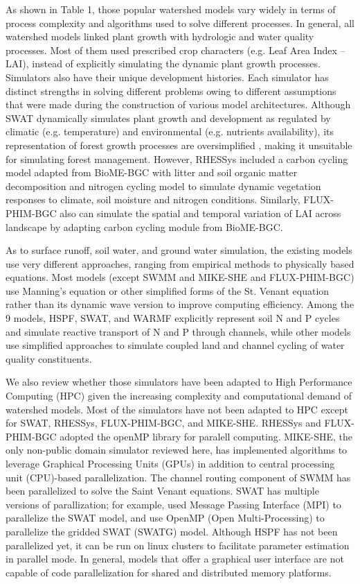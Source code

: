 \documentclass[preprint,review, 12pt]{elsarticle}
\begin{document}
As shown in Table 1, those popular watershed models vary widely in terms of process complexity and algorithms used to solve different processes. In general, all watershed models linked plant growth with hydrologic and water quality processes. Most of them used prescribed crop characters (e.g. Leaf Area Index -- LAI), instead of explicitly simulating the dynamic plant growth processes. Simulators also have their unique development histories. Each simulator has distinct strengths in solving different problems owing to different assumptions that were made during the construction of various model architectures. Although SWAT dynamically simulates plant growth and development as regulated by climatic (e.g. temperature) and environmental (e.g. nutrients availability), its representation of forest growth processes are oversimplified \citep{Yang2016}, making it unsuitable for simulating forest management. However, RHESSys \citep{Tague2004d} included a carbon cycling model adapted from BioME-BGC \citep{thornton1998regional} with litter and soil organic matter decomposition and nitrogen cycling model \citep{parton1996generalized} to simulate dynamic vegetation responses to climate, soil moisture and nitrogen conditions. Similarly, FLUX-PHIM-BGC \citep{Shi2018} also can simulate the spatial and temporal variation of LAI across landscape by adapting carbon cycling module from BioME-BGC.

As to surface runoff, soil water, and ground water simulation, the existing models use very different approaches, ranging from empirical methods to physically based equations. Most models (except SWMM and MIKE-SHE and FLUX-PHIM-BGC) use Manning’s equation or other simplified forms of the St. Venant equation rather than its dynamic wave version to improve computing efficiency. Among the 9 models, HSPF, SWAT, and WARMF explicitly represent soil N and P cycles and simulate reactive transport of N and P through channels, while other models use simplified approaches to simulate coupled land and channel cycling of water quality constituents. 

We also review whether those simulators have been adapted to High Performance Computing (HPC) given the increasing complexity and computational demand of watershed models. Most of the simulators have not been adapted to HPC except for SWAT, RHESSys, FLUX-PHIM-BGC, and MIKE-SHE. RHESSys and FLUX-PHIM-BGC adopted the openMP library for paralell computing. MIKE-SHE, the only non-public domain simulator reviewed here, has implemented algorithms to leverage Graphical Processing Units (GPUs) in addition to central processing unit (CPU)-based parallelization. The channel routing component of SWMM has been parallelized to solve the Saint Venant equations. SWAT has multiple versions of parallization; for example, \cite{Wu2013} used Message Passing Interface (MPI) to parallelize the SWAT model, and  \cite{Zhang2017} use OpenMP (Open Multi-Processing) to parallelize the gridded SWAT (SWATG) model. Although HSPF has not been parallelized yet, it can be run on linux clusters to facilitate parameter estimation in parallel mode. In general, models that offer a graphical user interface are not capable of code parallelization for shared and distributed memory platforms. 
\end{document}
